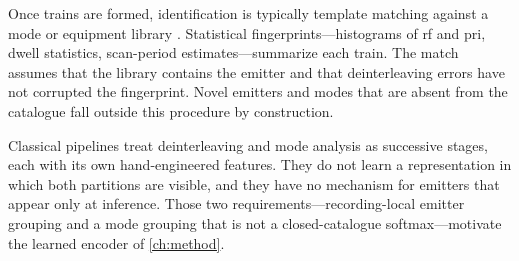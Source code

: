 Once trains are formed, identification is typically template matching against a mode or equipment library \parencite{wiley2006elint}.
Statistical fingerprints---histograms of \gls{rf} and \gls{pri}, dwell statistics, scan-period estimates---summarize each train.
The match assumes that the library contains the emitter and that deinterleaving errors have not corrupted the fingerprint.
Novel emitters and modes that are absent from the catalogue fall outside this procedure by construction.

Classical pipelines treat deinterleaving and mode analysis as successive stages, each with its own hand-engineered features.
They do not learn a representation in which both partitions are visible, and they have no mechanism for emitters that appear only at inference.
Those two requirements---recording-local emitter grouping and a mode grouping that is not a closed-catalogue softmax---motivate the learned encoder of \cref{ch:method}.

